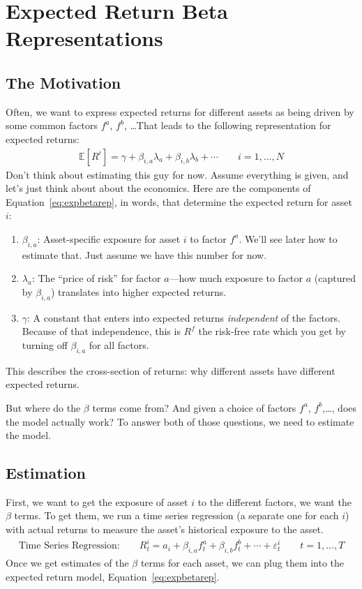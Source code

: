 \documentclass[12pt]{article}
\theoremstyle{plain}
\theoremstyle{definition}
\theoremstyle{remark}
\begin{document}
\section{Expected Return Beta Representations}

\subsection{The Motivation}

Often, we want to express expected returns for different assets as
being driven by some common factors $f^a$, $f^b$, \ldots That leads to
the following representation for expected returns:
\begin{align}
  \mathbb{E}[R^i]
  = \gamma + \beta_{i,a}\lambda_a + \beta_{i,b} \lambda_b + \cdots
  \qquad i = 1,\ldots,N
  \label{eq:expbetarep}
\end{align}
Don't think about estimating this guy for now. Assume everything is
given, and let's just think about about the economics. Here are the
components of Equation~\ref{eq:expbetarep}, in words, that determine the
expected return for asset $i$:
\begin{enumerate}
  \item $\beta_{i,a}$: Asset-specific exposure for asset $i$ to
    factor $f^a$. We'll see later how to estimate that. Just assume
    we have this number for now.
  \item $\lambda_a$: The ``price of risk'' for factor $a$---how much
    exposure to factor $a$ (captured by $\beta_{i,a}$) translates into
    higher expected returns.
  \item $\gamma$: A constant that enters into expected returns
    \emph{independent} of the factors. Because of that independence,
    this is $R^f$ the risk-free rate which you get by turning off
    $\beta_{i,a}$ for all factors.
\end{enumerate}
This describes the cross-section of returns: why different assets have
different expected returns.

But where do the $\beta$ terms come from? And given a choice of factors
$f^a$, $f^b$,\ldots, does the model actually work? To answer both of
those questions, we need to estimate the model.

\subsection{Estimation}

First, we want to get the exposure of asset $i$ to the different
factors, we want the $\beta$ terms. To get them, we run a time series
regression (a separate one for each $i$) with actual returns to measure
the asset's historical exposure to the asset.
\begin{align}
  \text{Time Series Regression:}\qquad
  R_t^i = a_i + \beta_{i,a} f_t^a + \beta_{i,b} f_t^b + \cdots
  + \varepsilon^i_t
  \qquad t = 1,\ldots,T
  \label{eq:getbetas}
\end{align}
Once we get estimates of the $\beta$ terms for each asset, we can plug
them into the expected return model, Equation~\ref{eq:expbetarep}.
\end{document}
